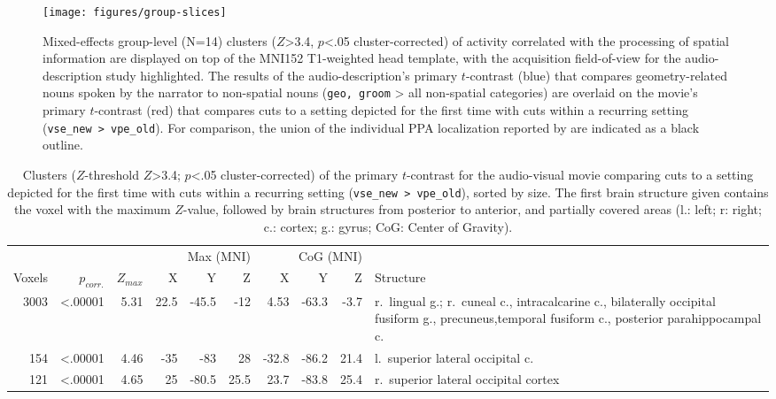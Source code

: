 \documentclass[english]{article}
\begin{document}
\begin{figure*}[tbp] \centering
    \texttt{[image: figures/group-slices]}

    \caption{Mixed-effects group-level (N=14) clusters ($Z$>3.4, $p$<.05
      cluster-corrected) of activity correlated with the processing of spatial
      information are displayed on top of the MNI152 T1-weighted head template,
      with the acquisition field-of-view for the audio-description study
      highlighted.
      The results of the audio-description's primary $t$-contrast (blue) that
      compares geometry-related nouns spoken by the narrator to non-spatial
      nouns (\texttt{geo, groom} > all non-spatial categories) are overlaid
      on the movie's primary $t$-contrast (red) that compares cuts to a
      setting depicted for the first time with cuts within a recurring setting
      (\texttt{vse\_new > vpe\_old}).
      For comparison, the union of the individual PPA localization reported
      by \cite{sengupta2016extension} are indicated as a black outline.
    }

    \label{fig:group-slices}
\end{figure*}


\begin{table*}[tbp]
\caption{Clusters ($Z$-threshold $Z$>3.4; $p$<.05 cluster-corrected)
    of the primary $t$-contrast for the audio-visual movie comparing cuts to a
    setting depicted for the first time with cuts within a recurring setting
    (\texttt{vse\_new > vpe\_old}), sorted by size.
    The first brain structure given contains the voxel with the maximum $Z$-value,
    followed by brain structures from posterior to anterior, and partially
    covered areas (l.: left; r: right; c.: cortex; g.: gyrus; CoG: Center of
  Gravity).}
\label{tab:res-av-group1}
\small
\begin{tabular}{rrrrrrrrrp{4.7cm}}
\toprule
& & & \multicolumn{3}{r}{Max (MNI)} & \multicolumn{3}{r}{CoG (MNI)} &
\\ \cmidrule{4-6} \cmidrule{7-9}
Voxels & $p_{corr.}$ & $Z_{max}$ & X & Y & Z  & X & Y & Z & Structure \\
\midrule
3003 & <.00001 & 5.31 & 22.5 & -45.5 & -12 & 4.53 & -63.3 & -3.7 & r.~lingual g.; r.~cuneal c., intracalcarine c., bilaterally occipital fusiform g., precuneus,temporal fusiform c., posterior parahippocampal c.  \\
154 & <.00001 & 4.46 & -35 & -83 & 28 & -32.8 & -86.2 & 21.4 & l.~superior
lateral occipital c. \\ %
121 & <.00001 & 4.65 & 25 & -80.5 & 25.5 & 23.7 & -83.8 & 25.4 & r.~superior
lateral occipital cortex \\ %
\bottomrule
\end{tabular}
\end{table*}
\end{document}
